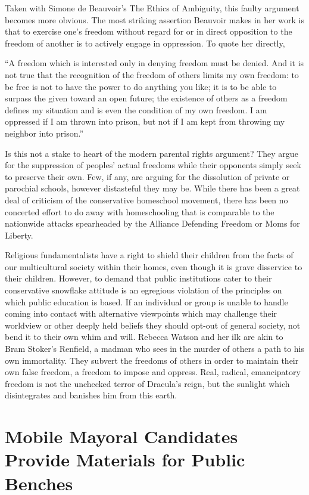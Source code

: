 \documentclass[
]{book}
\begin{document}
Taken with Simone de Beauvoir's The Ethics of Ambiguity, this faulty argument becomes more obvious. The most striking assertion Beauvoir makes in her work is that to exercise one's freedom without regard for or in direct opposition to the freedom of another is to actively engage in oppression. To quote her directly,

``A freedom which is interested only in denying freedom must be denied. And it is not true that the recognition of the freedom of others limits my own freedom: to be free is not to have the power to do anything you like; it is to be able to surpass the given toward an open future; the existence of others as a freedom defines my situation and is even the condition of my own freedom. I am oppressed if I am thrown into prison, but not if I am kept from throwing my neighbor into prison.''

Is this not a stake to heart of the modern parental rights argument? They argue for the suppression of peoples' actual freedoms while their opponents simply seek to preserve their own. Few, if any, are arguing for the dissolution of private or parochial schools, however distasteful they may be. While there has been a great deal of criticism of the conservative homeschool movement, there has been no concerted effort to do away with homeschooling that is comparable to the nationwide attacks spearheaded by the Alliance Defending Freedom or Moms for Liberty.

Religious fundamentalists have a right to shield their children from the facts of our multicultural society within their homes, even though it is grave disservice to their children. However, to demand that public institutions cater to their conservative snowflake attitude is an egregious violation of the principles on which public education is based. If an individual or group is unable to handle coming into contact with alternative viewpoints which may challenge their worldview or other deeply held beliefs they should opt-out of general society, not bend it to their own whim and will. Rebecca Watson and her ilk are akin to Bram Stoker's Renfield, a madman who sees in the murder of others a path to his own immortality. They subvert the freedoms of others in order to maintain their own false freedom, a freedom to impose and oppress. Real, radical, emancipatory freedom is not the unchecked terror of Dracula's reign, but the sunlight which disintegrates and banishes him from this earth.

\section*{Mobile Mayoral Candidates Provide Materials for Public Benches}\label{mobile-mayoral-candidates-provide-materials-for-public-benches}
\end{document}
